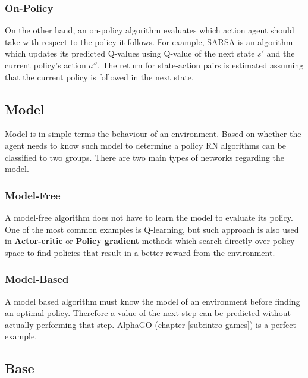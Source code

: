 \subsubsection*{On-Policy}
\label{sub2:on-policy}

On the other hand, an on-policy algorithm evaluates which action agent should take with respect to the policy it follows. For example, SARSA is an algorithm which updates its predicted Q-values using Q-value of the next state $s'$ and the current policy's action $a''$. The return for state-action pairs is estimated assuming that the current policy is followed in the next state.

\subsection{Model}
\label{sub:model}

Model is in simple terms the behaviour of an environment. Based on whether the agent needs to know such model to determine a policy RN algorithms can be classified to two groups. There are two main types of networks regarding the model.

\subsubsection*{Model-Free}
\label{sub2:model-free}

A model-free algorithm does not have to learn the model to evaluate its policy. One of the most common examples is Q-learning, but such approach is also used in \textbf{Actor-critic} or \textbf{Policy gradient} methods which search directly over policy space to find policies that result in a better reward from the environment.

\subsubsection*{Model-Based}
\label{sub2:model-based}

A model based algorithm must know the model of an environment before finding an optimal policy. Therefore a value of the next step can be predicted without actually performing that step. \mbox{AlphaGO} (chapter \ref{sub:intro-games}) is a perfect example.

\subsection{Base}
\label{sub:base}

